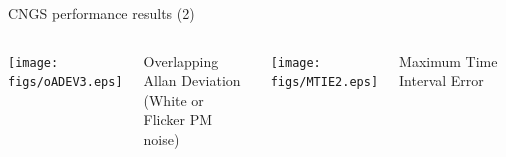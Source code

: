 \documentclass[compress,red]{beamer}
\begin{document}
\begin{frame}{CNGS performance results (2)}

  \begin{columns}[c]
		\begin{center}
		\texttt{[image: figs/oADEV3.eps]}
		\end{center}
		\begin{center}
		  Overlapping Allan Deviation \\
		  (White or Flicker PM noise)
		\end{center}


		\begin{center}
		\texttt{[image: figs/MTIE2.eps]}
		\end{center}
		\begin{center}
		Maximum Time Interval Error
		\end{center}
  \end{columns}
  \begin{columns}[c]

  \end{columns}

\end{frame}
\end{document}
